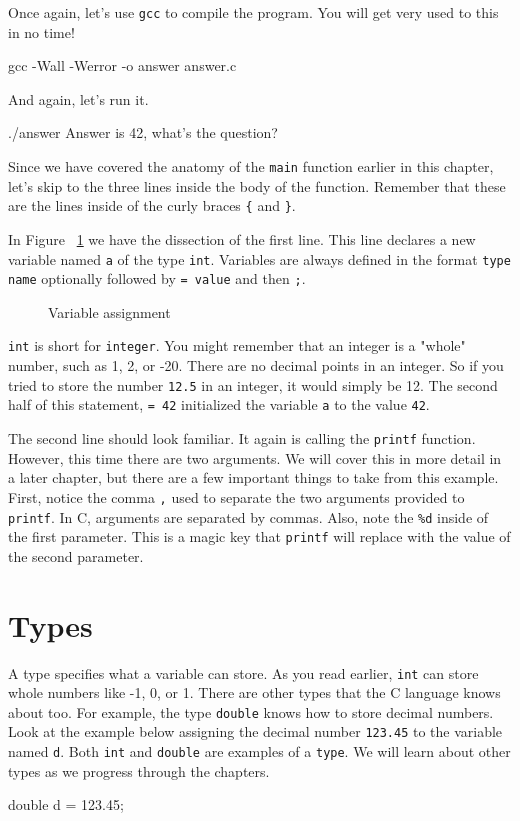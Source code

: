 \documentclass[12pt]{article}
\begin{document}
Once again, let's use \verb|gcc| to compile the program. You will get very used
to this in no time!

\begin{Terminal}
gcc -Wall -Werror -o answer answer.c
\end{Terminal}

And again, let's run it.

\begin{Terminal}
./answer
Answer is 42, what's the question?
\end{Terminal}

Since we have covered the anatomy of the \verb|main| function earlier in this
chapter, let's skip to the three lines inside the body of the function. Remember
that these are the lines inside of the curly braces \verb|{| and \verb|}|.

In Figure ~\ref{fig:assignment} we have the dissection of the first line.
This line declares a new variable named \verb|a| of the type \verb|int|.
Variables are always defined in the format \verb|type name| optionally
followed by \verb|= value| and then \verb|;|.

\begin{figure}
	\centering
	
	\caption{Variable assignment}
	\label{fig:assignment}
\end{figure}

\verb|int| is short for \verb|integer|.  You might remember that an integer is
a "whole" number, such as 1, 2, or -20.  There are no decimal points in an
integer. So if you tried to store the number \verb|12.5| in an integer, it
would simply be 12. The second half of this statement, \verb|= 42| initialized
the variable \verb|a| to the value \verb|42|.

The second line should look familiar. It again is calling the \verb|printf|
function. However, this time there are two arguments. We will cover this in
more detail in a later chapter, but there are a few important things to take
from this example. First, notice the comma \verb|,| used to separate the two
arguments provided to \verb|printf|. In C, arguments are separated by commas.
Also, note the \verb|%d| inside of the first parameter. This is a magic key
that \verb|printf| will replace with the value of the second parameter.

\section{Types}

A type specifies what a variable can store. As you read earlier, \verb|int| can
store whole numbers like -1, 0, or 1. There are other types that the C language
knows about too. For example, the type \verb|double| knows how to store decimal
numbers. Look at the example below assigning the decimal number \verb|123.45|
to the variable named \verb|d|. Both \verb|int| and \verb|double| are examples
of a \verb|type|. We will learn about other types as we progress through the
chapters.

\begin{Terminal}
double d = 123.45;
\end{Terminal}
\end{document}
